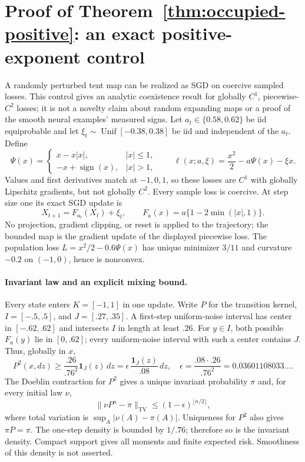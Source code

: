 \section{Proof of Theorem~\ref{thm:occupied-positive}: an exact positive-exponent control}
\label{sec:piecewise-exact}
A randomly perturbed tent map can be realized as SGD on coercive sampled
losses. This control gives an analytic coexistence result for globally
$C^1$, piecewise-$C^2$ losses; it is not a novelty claim about random
expanding maps or a proof of the smooth neural examples' measured signs.
Let $a_t\in\{0.58,0.62\}$ be iid equiprobable and let
$\xi_t\sim\operatorname{Unif}[-0.38,0.38]$ be iid and independent of the
$a_t$. Define
\[
\Psi(x)=\begin{cases}x-x|x|,&|x|\le1,\\
-x+\operatorname{sign}(x),&|x|>1,
\end{cases}
\qquad \ell(x;a,\xi)=\frac{x^2}{2}-a\Psi(x)-\xi x.
\]
Values and first derivatives match at $-1,0,1$, so these losses are $C^1$
with globally Lipschitz gradients, but not globally $C^2$. Every sample
loss is coercive. At step size one its exact SGD update is
\[
X_{t+1}=F_{a_t}(X_t)+\xi_t,\qquad
F_a(x)=a\{1-2\min(|x|,1)\}.
\]
No projection, gradient clipping, or reset is applied to the trajectory;
the bounded map is the gradient update of the displayed piecewise loss.
The population loss $L=x^2/2-0.6\Psi(x)$ has unique minimizer $3/11$ and
curvature $-0.2$ on $(-1,0)$, hence is nonconvex.

\paragraph{Invariant law and an explicit mixing bound.}
Every state enters $K=[-1,1]$ in one update. Write $P$ for the transition
kernel, $I=[-.5,.5]$, and $J=[.27,.35]$. A first-step uniform-noise interval
has center in $[-.62,.62]$ and intersects $I$ in length at least $.26$.
For $y\in I$, both possible $F_a(y)$ lie in $[0,.62]$; every uniform-noise
interval with such a center contains $J$. Thus, globally in $x$,
\[
P^2(x,dz)\ge\frac{.26}{.76^2}\mathbf1_J(z)\,dz
=\epsilon\,\frac{\mathbf1_J(z)}{.08}\,dz,
\quad \epsilon=\frac{.08\cdot.26}{.76^2}
=0.03601108033\ldots.
\]
The Doeblin contraction for $P^2$ gives a unique invariant probability
$\pi$ and, for every initial law $\nu$,
\[
\|\nu P^n-\pi\|_{\mathrm{TV}}
\le(1-\epsilon)^{\lfloor n/2\rfloor},
\]
where total variation is $\sup_A|\nu(A)-\pi(A)|$. Uniqueness for $P^2$
also gives $\pi P=\pi$. The one-step density is bounded by $1/.76$;
therefore so is the invariant density. Compact support gives all moments
and finite expected risk. Smoothness of this density is not asserted.

